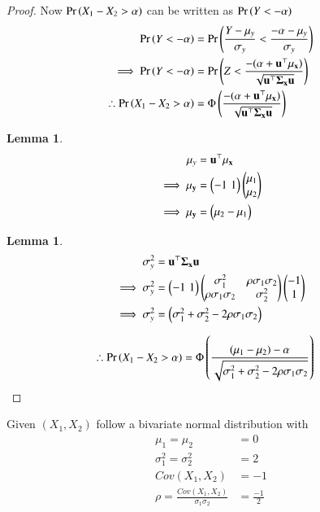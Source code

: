 \documentclass[journal,12pt,twocolumn]{IEEEtran}
\newtheorem{lemma}[theorem]{Lemma}
\begin{document}
\begin{proof}
    Now $\Pr\left(X_1-X_2>\alpha\right)$ can be written as $\Pr\left(Y<-\alpha\right)$
    \begin{align}
        \Pr\left(Y<-\alpha\right)&=\Pr\left(\frac{Y-\mu_y}{\sigma_y}<\frac{-\alpha-\mu_y}{\sigma_y}\right)\\
        \implies \Pr\left(Y<-\alpha\right)&=\Pr\left(Z<\frac{-(\alpha+\mathbf{u}^{\top}\mathbf{\mu_{\mathbf{x}})}}{\sqrt{\mathbf{u}^{\top}\mathbf{\Sigma_{\mathbf{x}}}\mathbf{u}}}\right)\\
        \therefore \Pr\left(X_1-X_2>\alpha\right)&=\Phi\left(\frac{-(\alpha+\mathbf{u}^{\top}\mathbf{\mu_{\mathbf{x}})}}{\sqrt{\mathbf{u}^{\top}\mathbf{\Sigma_{\mathbf{x}}}\mathbf{u}}}\right)
    \end{align}
    \begin{lemma}
        \begin{align}
            \mu_{y}&=\mathbf{u}^{\top}\mathbf{\mu_{\mathbf{x}}}\\
            \implies \mu_{\mathbf{y}}&=\begin{pmatrix}-1\,\,1\end{pmatrix}\begin{pmatrix}\mu_1\\
                                                      \mu_2\end{pmatrix}\\
            \implies \mu_{\mathbf{y}}&=\begin{pmatrix}\mu_2-\mu_1\end{pmatrix}
        \end{align}
    \end{lemma}
    \begin{lemma}
        \begin{align}
        \sigma^2_{y}&=\mathbf{u}^{\top}\mathbf{\Sigma_{\mathbf{x}}}\mathbf{u}\\
        \implies \sigma^2_{y}&=\begin{pmatrix}-1\,\,1\end{pmatrix}\begin{pmatrix}\sigma^2_1&\rho\sigma_1\sigma_2\\
                                                         \rho\sigma_1\sigma_2&\sigma^2_2\end{pmatrix}\begin{pmatrix}-1\\
                                                                                                1\end{pmatrix}\\
        \implies \sigma^2_{y}&=\begin{pmatrix}\sigma^2_1+\sigma^2_2-2\rho\sigma_1\sigma_2\end{pmatrix}
        \end{align}
    \end{lemma}
    \begin{align}
        \therefore \Pr\left(X_1-X_2>\alpha\right)&=\Phi\left(\frac{(\mu_1-\mu_2)-\alpha}{\sqrt{\sigma^2_1+\sigma^2_2-2\rho\sigma_1\sigma_2}}\right)
    \end{align}
\end{proof}
Given $(X_1,X_2)$ follow a bivariate normal distribution with
\begin{align}
    \mu_1=\mu_2&=0\\
    \sigma^2_1=\sigma^2_2&=2\\
    Cov(X_1,X_2)&=-1\\
    \rho=\frac{Cov(X_1,X_2)}{\sigma_1\sigma_2}&=\frac{-1}{2}
\end{align}
\end{document}
